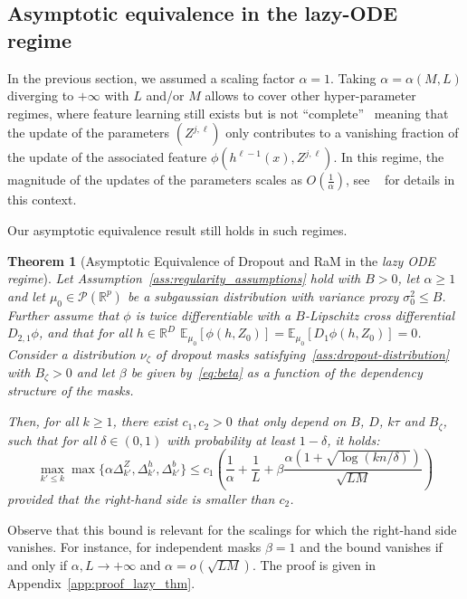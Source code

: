 \documentclass[a4paper,11pt]{article}
\newcommand{\R}{\mathbb{R}}
\newcommand{\1}{\mathbbm{1}}
\newcommand{\E}{\mathbb{E}}
\newtheorem{theorem}{Theorem}[section]
\theoremstyle{definition}
\theoremstyle{remark}
\begin{document}
\subsection{Asymptotic equivalence in the lazy-ODE regime}\label{sec:equivalence_in_lazy_ode}
In the previous section, we assumed a scaling factor $\alpha=1$. Taking $\alpha=\alpha(M,L)$ diverging to $+\infty$ with $L$ and/or $M$ allows to cover other hyper-parameter regimes, where feature learning still exists but is not ``complete''~\cite{dey2026dontlazycompletepenables} meaning that the update of the parameters $(Z^{j,\ell})$ only contributes to a vanishing fraction of the update of the associated feature $\phi(h^{\ell-1}(x),Z^{j,\ell})$.  In this regime, the magnitude of the updates of the parameters scales as $O(\frac{1}{\alpha})$, see ~\cite{chizat2025hidden} for details in this context. 

Our asymptotic equivalence result still holds in such regimes. 
\begin{theorem}[Asymptotic Equivalence of Dropout and RaM in the \emph{lazy ODE regime}]\label{thm:lazy_thm}
Let Assumption~\ref{ass:regularity_assumptions} hold with $B>0$, let $\alpha \geq 1$ and let $\mu_0\in\mathcal{P}(\R^p)$ be a subgaussian distribution with variance proxy $\sigma_0^2 \leq B$.
Further assume that $\phi$ is twice differentiable with a $B$-Lipschitz cross differential $D_{2,1}\phi$, and that for all $h\in \R^D$ $\E_{\mu_0}[\phi(h, Z_0)] = \E_{\mu_0}[D_1\phi(h, Z_0)] = 0$. Consider a distribution $\nu_\zeta$ of dropout masks satisfying~\eqref{ass:dropout-distribution} with $B_\zeta>0$ and let $\beta$ be given by~\eqref{eq:beta} as a function of the dependency structure of the masks.

Then, for all $k\geq 1$, there exist $c_1, c_2 > 0$ that only depend on $B$, $D$, $k\tau$ and
$B_\zeta$, such that for all $\delta\in(0,1)$ with probability at least $1 - \delta$, it holds:
\[
  \max_{k'\leq k} \max \{\alpha\Delta_{k'}^Z, \Delta_{k'}^h, \Delta_{k'}^b\}
  \leq c_1 \left(\frac{1}{\alpha} + \frac{1}{L}
    +  \beta\frac{\alpha(1+ \sqrt{\log(kn/\delta)})}{\sqrt{LM}}
  \right)
\]
provided that the right-hand side is smaller than $c_2$.
\end{theorem}

Observe that this bound is relevant for the scalings for which the right-hand side vanishes. For instance, for independent masks $\beta=1$ and the bound vanishes if and only if $\alpha,L \to +\infty$ and $\alpha = o(\sqrt{LM})$. The proof is given in Appendix~\ref{app:proof_lazy_thm}.
\end{document}
